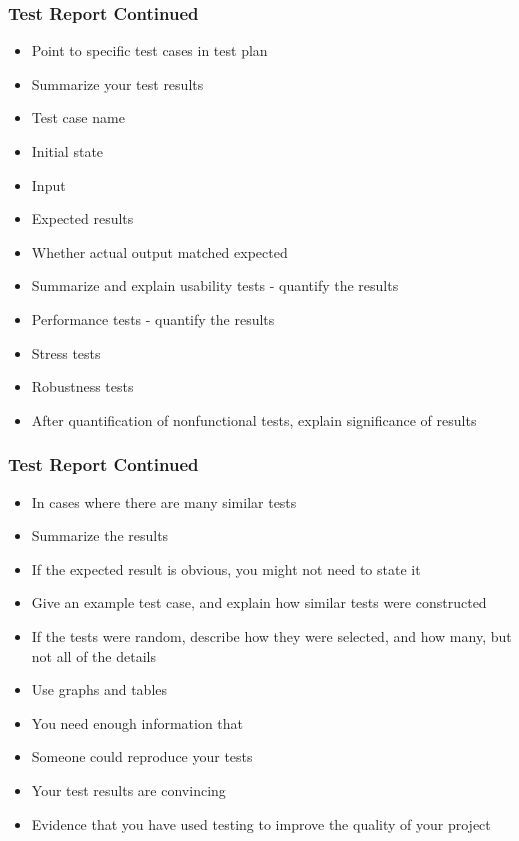 \documentclass[t,12pt,numbers,fleqn]{beamer}
\begin{document}
\begin{frame}
\frametitle{Test Report Continued}
\begin{itemize}
\item Point to specific test cases in test plan
\item Summarize your test results
\bi
\item Test case name
\item Initial state
\item Input
\item Expected results
\item Whether actual output matched expected
\ei
\item Summarize and explain usability tests - quantify the results
\item Performance tests - quantify the results
\item Stress tests
\item Robustness tests
\item After quantification of nonfunctional tests, explain significance of
  results
\end{itemize}
\end{frame}


\begin{frame}
\frametitle{Test Report Continued}
\begin{itemize}
\item In cases where there are many similar tests
\bi
\item Summarize the results
\item If the expected result is obvious, you might not need to state it
\item Give an example test case, and explain how similar tests were constructed
\item If the tests were random, describe how they were selected, and how many,
  but not all of the details
\item Use graphs and tables
\item You need enough information that
\bi
\item Someone could reproduce your tests
\item Your test results are convincing
\item Evidence that you have used testing to improve the quality of your project
\ei
\ei
\end{itemize}
\end{frame}

\end{document}
